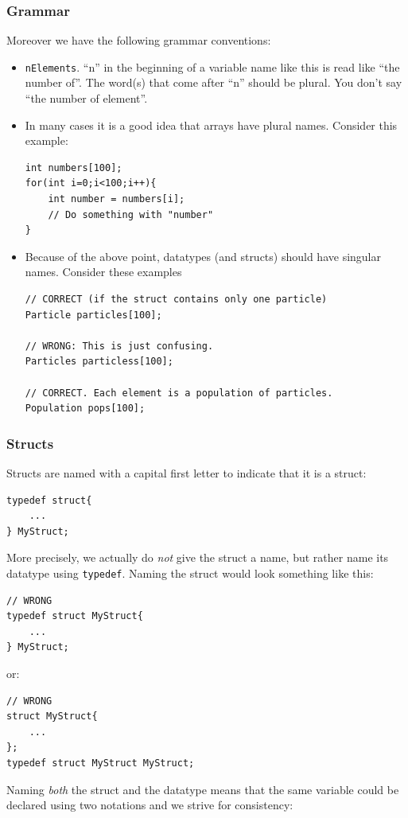 \documentclass[10pt,a4paper]{article}
\begin{document}
\subsubsection{Grammar}
Moreover we have the following grammar conventions:
		\begin{itemize}
			\item \lstinline$nElements$. ``n'' in the beginning of a variable name like this is read like ``the number of''. The word(s) that come after ``n'' should be plural. You don't say ``the number of element''.
			\item In many cases it is a good idea that arrays have plural names. Consider this example:
\begin{lstlisting}
int numbers[100];
for(int i=0;i<100;i++){
	int number = numbers[i];
	// Do something with "number"
}
\end{lstlisting}
			\item Because of the above point, datatypes (and structs) should have singular names. Consider these examples
\begin{lstlisting}
// CORRECT (if the struct contains only one particle)
Particle particles[100];

// WRONG: This is just confusing.
Particles particless[100];

// CORRECT. Each element is a population of particles.
Population pops[100];
\end{lstlisting}
		\end{itemize}

\subsubsection{Structs}
Structs are named with a capital first letter to indicate that it is a struct:

\begin{lstlisting}
typedef struct{
	...
} MyStruct;
\end{lstlisting}
More precisely, we actually do \emph{not} give the struct a name, but rather name its datatype using \lstinline$typedef$. Naming the struct would look something like this:

\begin{lstlisting}
// WRONG
typedef struct MyStruct{
	...
} MyStruct;
\end{lstlisting}
or:
\begin{lstlisting}
// WRONG
struct MyStruct{
	...
};
typedef struct MyStruct MyStruct;
\end{lstlisting}
Naming \emph{both} the struct and the datatype means that the same variable could be declared using two notations and we strive for consistency:
\end{document}
